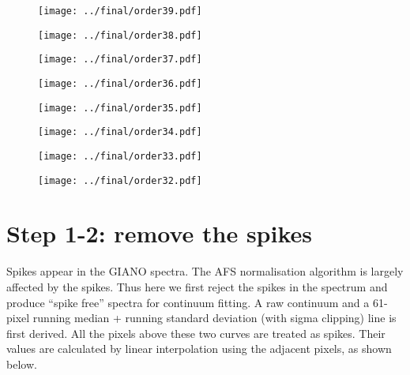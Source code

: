 \documentclass{article}
\begin{document}
\begin{figure}[H]
    \centering
    \texttt{[image: ../final/order39.pdf]}
\end{figure}
\begin{figure}[H]
    \centering
    \texttt{[image: ../final/order38.pdf]}
\end{figure}
\begin{figure}[H]
    \centering
    \texttt{[image: ../final/order37.pdf]}
\end{figure}
\begin{figure}[H]
    \centering
    \texttt{[image: ../final/order36.pdf]}
\end{figure}
\begin{figure}[H]
    \centering
    \texttt{[image: ../final/order35.pdf]}
\end{figure}
\begin{figure}[H]
    \centering
    \texttt{[image: ../final/order34.pdf]}
\end{figure}
\begin{figure}[H]
    \centering
    \texttt{[image: ../final/order33.pdf]}
\end{figure}
\begin{figure}[H]
    \centering
    \texttt{[image: ../final/order32.pdf]}
\end{figure}

\newpage

\section{Step 1-2: remove the spikes}

Spikes appear in the GIANO spectra.
The AFS normalisation algorithm is largely affected by the spikes. 
Thus here we first reject the spikes in the spectrum and produce ``spike free'' spectra for continuum fitting.
A raw continuum and a 61-pixel running median + running standard deviation (with sigma clipping) line is first derived. 
All the pixels above these two curves are treated as spikes. 
Their values are calculated by linear interpolation using the adjacent pixels, as shown below.
\end{document}

